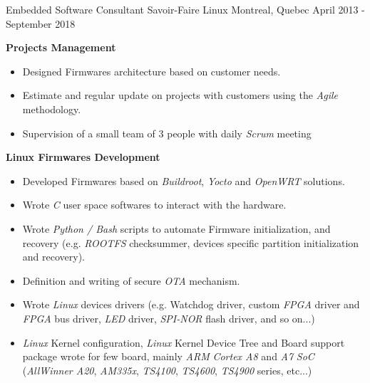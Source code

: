 

\begin{cventries}

  \cventry
    {Embedded Software Consultant} %
    {Savoir-Faire Linux} %
    {Montreal, Quebec} %
    {April 2013 - September 2018} %
    {
      \begin{cvitems} %
        \item{\textbf{Projects Management}}
          \begin{itemize}
            \item{Designed Firmwares architecture based on customer needs.}
            \item{Estimate and regular update on projects with customers using the \textit{Agile} methodology.}
            \item{Supervision of a small team of 3 people with daily \textit{Scrum} meeting}
          \end{itemize}
        \item{\textbf{Linux Firmwares Development}}
          \begin{itemize}
            \item{Developed Firmwares based on \textit{Buildroot}, \textit{Yocto} and \textit{OpenWRT} solutions.}
            \item{Wrote \textit{C} user space softwares to interact with the hardware.}
            \item{Wrote \textit{Python / Bash} scripts to automate Firmware initialization, and recovery (e.g. \textit{ROOTFS} checksummer, devices specific partition initialization and recovery).}
            \item{Definition and writing of secure \textit{OTA} mechanism.}
            \item{Wrote \textit{Linux} devices drivers (e.g. Watchdog driver, custom \textit{FPGA} driver and \textit{FPGA} bus driver, \textit{LED} driver, \textit{SPI-NOR} flash driver, and so on...)}
            \item{\textit{Linux} Kernel configuration, \textit{Linux} Kernel Device Tree and Board support package wrote for few board, mainly \textit{ARM} \textit{Cortex A8} and \textit{A7} \textit{SoC} (\textit{AllWinner A20}, \textit{AM335x}, \textit{TS4100}, \textit{TS4600}, \textit{TS4900} series, etc...)}

\end{itemize}
\end{cvitems}}
\end{cventries}
